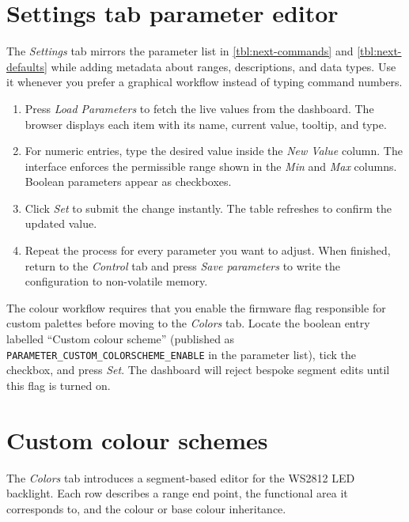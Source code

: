 \section{Settings tab parameter editor}
The \emph{Settings} tab mirrors the parameter list in \autoref{tbl:next-commands} and \autoref{tbl:next-defaults} while adding metadata about ranges, descriptions, and data types.
Use it whenever you prefer a graphical workflow instead of typing command numbers.

\begin{enumerate}
    \item Press \emph{Load Parameters} to fetch the live values from the dashboard. The browser displays each item with its name, current value, tooltip, and type.
    \item For numeric entries, type the desired value inside the \emph{New Value} column. The interface enforces the permissible range shown in the \emph{Min} and \emph{Max} columns. Boolean parameters appear as checkboxes.
    \item Click \emph{Set} to submit the change instantly. The table refreshes to confirm the updated value.
    \item Repeat the process for every parameter you want to adjust. When finished, return to the \emph{Control} tab and press \emph{Save parameters} to write the configuration to non-volatile memory.
\end{enumerate}

The colour workflow requires that you enable the firmware flag responsible for custom palettes before moving to the \emph{Colors} tab.
Locate the boolean entry labelled ``Custom colour scheme'' (published as \verb|PARAMETER_CUSTOM_COLORSCHEME_ENABLE| in the parameter list), tick the checkbox, and press \emph{Set}. The dashboard will reject bespoke segment edits until this flag is turned on.

\section{Custom colour schemes}
The \emph{Colors} tab introduces a segment-based editor for the WS2812 LED backlight. Each row describes a range end point, the functional area it corresponds to, and the colour or base colour inheritance.

